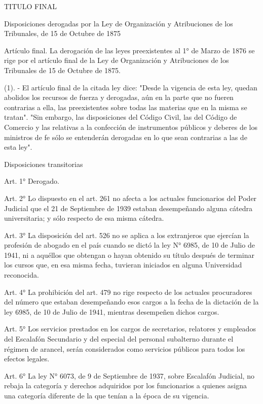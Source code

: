     TITULO FINAL

    Disposiciones derogadas por la Ley de Organización y Atribuciones de los Tribunales, de 15 de Octubre de 1875


    Artículo final. La derogación de las leyes preexistentes al 1° de Marzo de 1876 se rige por el artículo final de la Ley de Organización y Atribuciones de los Tribunales de 15 de Octubre de 1875.

    (1). - El artículo final de la citada ley dice: "Desde la vigencia de esta ley, quedan abolidos los recursos de fuerza y derogadas, aún en la parte que no fueren contrarias a ella, las preexistentes sobre todas las materias que en la misma se tratan".
    "Sin embargo, las disposiciones del Código Civil, las del Código de Comercio y las relativas a la confección de instrumentos públicos y deberes de los ministros de fe sólo se entenderán derogadas en lo que sean contrarias a las de esta ley".

    Disposiciones transitorias

    Art. 1° Derogado.

    Art. 2° Lo dispuesto en el art. 261 no afecta a los actuales funcionarios del Poder Judicial que el 21 de Septiembre de 1939 estaban desempeñando alguna cátedra universitaria; y sólo respecto de esa misma cátedra.


    Art. 3° La disposición del art. 526 no se aplica a los extranjeros que ejercían la profesión de abogado en el país cuando se dictó la ley N° 6985, de 10 de Julio de 1941, ni a aquéllos que obtengan o hayan obtenido su título después de terminar los cursos que, en esa misma fecha, tuvieran iniciados en alguna Universidad reconocida.


    Art. 4° La prohibición del art. 479 no rige respecto de los actuales procuradores del número que estaban desempeñando esos cargos a la fecha de la dictación de la ley 6985, de 10 de Julio de 1941, mientras desempeñen dichos cargos.



    Art. 5° Los servicios prestados en los cargos de secretarios, relatores y empleados del Escalafón Secundario y del especial del personal subalterno durante el régimen de arancel, serán considerados como servicios públicos para todos los efectos legales.


    Art. 6° La ley N° 6073, de 9 de Septiembre de 1937, sobre Escalafón Judicial, no rebaja la categoría y derechos adquiridos por los funcionarios a quienes asigna una categoría diferente de la que tenían a la época de su vigencia.


